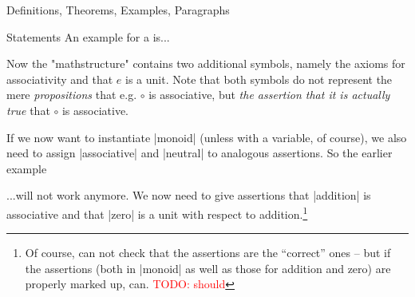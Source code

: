 \begin{sfragment}{Definitions, Theorems, Examples, Paragraphs}
\begin{smodule}{Statements}
{An example for a  is...
    }

    Now the \stexcode"mathstructure"  contains
    two additional symbols, namely the axioms for associativity
    and that $e$ is a unit. Note that both symbols do not
    represent the mere \emph{propositions} that e.g. 
    $\circ$ is associative, but \emph{the assertion that it is
    actually true} that $\circ$ is associative.
    
    If we now want to instantiate |monoid| (unless with a variable,
    of course), we also need to assign |associative| and |neutral|
    to analogous assertions. So the earlier example
    \begin{latexcode}[gobble=8]
    \end{latexcode}
    ...will not work anymore. We now need to give assertions that
    |addition| is associative and that |zero| is a unit with respect
    to addition.\footnote{Of course, \sTeX can not check that
    the assertions are the ``correct'' ones -- but if
    the assertions (both in |monoid| as well as those for addition and
    zero) are properly marked up, \mmt can. \textcolor{red}{TODO: should}}

\end{smodule}
\end{sfragment}